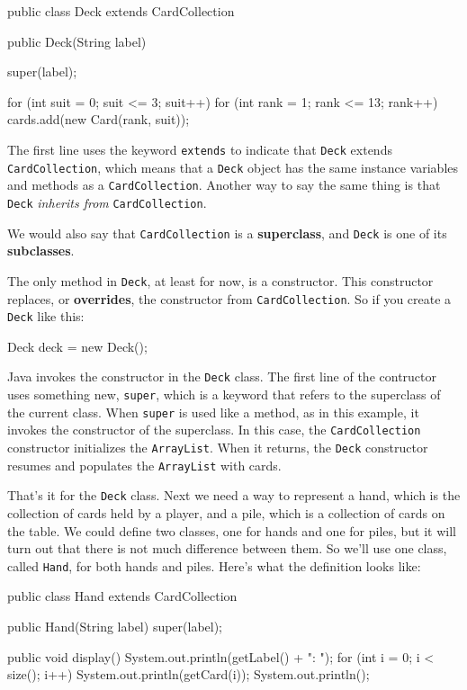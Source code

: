\documentclass[12pt]{book}
\theoremstyle{exercise}
\newcommand{\java}[1]{\verb"#1"}
\newcommand{\java}[1]{\lstinline{#1}} %
\begin{document}
\begin{code}
public class Deck extends CardCollection {
    
    public Deck(String label) {
        super(label);

        for (int suit = 0; suit <= 3; suit++) {
            for (int rank = 1; rank <= 13; rank++) {
                cards.add(new Card(rank, suit));
            }
        }
    }
}
\end{code}

The first line uses the keyword \java{extends} to indicate that \java{Deck} extends \java{CardCollection}, which means that a \java{Deck} object has the same instance variables and methods as a \java{CardCollection}.
Another way to say the same thing is that \java{Deck} {\em inherits from} \java{CardCollection}.

We would also say that \java{CardCollection} is a {\bf superclass}, and \java{Deck} is one of its {\bf subclasses}.


The only method in \java{Deck}, at least for now, is a constructor.
This constructor replaces, or {\bf overrides}, the constructor from \java{CardCollection}.
So if you create a \java{Deck} like this:

\begin{code}
    Deck deck = new Deck();
\end{code}

Java invokes the constructor in the \java{Deck} class.
The first line of the contructor uses something new, \java{super}, which is a keyword that refers to the superclass of the current class.
When \java{super} is used like a method, as in this example, it invokes the constructor of the superclass.
In this case, the \java{CardCollection} constructor initializes the \java{ArrayList}.
When it returns, the \java{Deck} constructor resumes and populates the \java{ArrayList} with cards.

That's it for the \java{Deck} class.
Next we need a way to represent a hand, which is the collection of cards held by a player, and a pile, which is a collection of cards on the table.
We could define two classes, one for hands and one for piles, but it will turn out that there is not much difference between them.
So we'll use one class, called \java{Hand}, for both hands and piles.
Here's what the definition looks like:

\begin{code}
public class Hand extends CardCollection {

    public Hand(String label) {
        super(label);
    }

    public void display() {
        System.out.println(getLabel() + ": ");
        for (int i = 0; i < size(); i++) {
            System.out.println(getCard(i));
        }
        System.out.println();
    }
}
\end{code}
\end{document}
